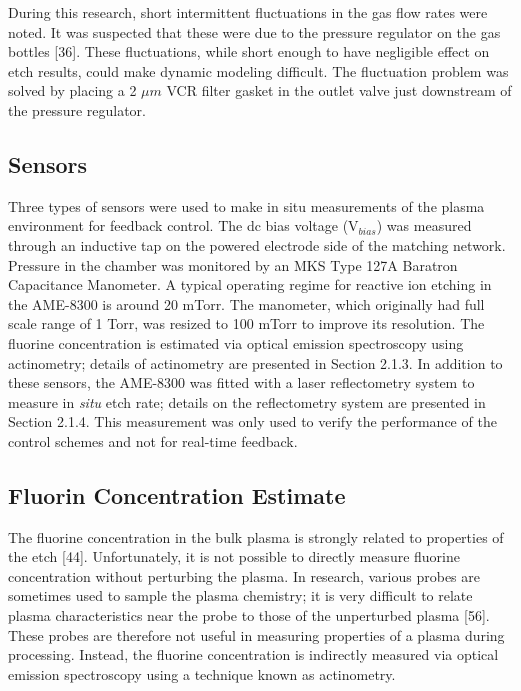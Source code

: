 During this research, short intermittent fluctuations in the gas flow rates were noted.
It was suspected that these were due to the pressure regulator on the gas bottles [36].
These fluctuations, while short enough to have negligible effect on etch results, could make
dynamic modeling difficult. The fluctuation problem was solved by placing a 2 $\mu m$ VCR
filter gasket in the outlet valve just downstream of the pressure regulator.

\subsection{Sensors}

\tab Three types of sensors were used to make in situ measurements of the plasma environment for feedback control. The dc bias voltage ($\text{V}_{bias}$) was measured through an inductive
tap on the powered electrode side of the matching network. Pressure in the chamber was
monitored by an MKS Type 127A Baratron Capacitance Manometer. A typical operating
regime for reactive ion etching in the AME-8300 is around 20 mTorr. The manometer, which
originally had full scale range of 1 Torr, was resized to 100 mTorr to improve its resolution.
The fluorine concentration is estimated via optical emission spectroscopy using actinometry; details of actinometry are presented in Section 2.1.3. In addition to these sensors, the
AME-8300 was fitted with a laser reflectometry system to measure in \textit{situ} etch rate; details on the reflectometry system are presented in Section 2.1.4. This measurement was only
used to verify the performance of the control schemes and not for real-time feedback.

\subsection{Fluorin Concentration Estimate}

\tab The fluorine concentration in the bulk plasma is strongly related to properties of the
etch [44]. Unfortunately, it is not possible to directly measure fluorine concentration without
perturbing the plasma. In research, various probes are sometimes used to sample the plasma
chemistry; it is very difficult to relate plasma characteristics near the probe to those of the
unperturbed plasma [56]. These probes are therefore not useful in measuring properties of
a plasma during processing. Instead, the fluorine concentration is indirectly measured via
optical emission spectroscopy using a technique known as actinometry.

